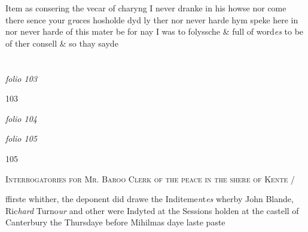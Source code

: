 \documentclass[12pt, a4paper]{book}
\begin{document}
		\ifthenelse{\isodd{\thepage}}
		{\reversemarginpar}
		{\normalmarginpar}
		Item as consering the vecar of charyng I never dranke
 	in his howse nor come there sence your g\textit{ra}ces hosholde dyd
 ly ther nor never harde hym speke here in nor never
 harde of this mater be for nay I was to folyssche \&  full
 of word\textit{es} to be of ther consell \& so thay sayde

\dotfill
						\newpage {} \section*{}  \subsection*{}

\textit{folio 103}



\begin{flushright}{\color{Mahogany}103}\end{flushright}

\dotfill
						\newpage
{}

\textit{folio 104}


               \vspace*{4cm}
               
\dotfill
						

\textit{folio 105}


\begin{flushright}{\color{Mahogany}105}\end{flushright}

				\begin{center} \begin{large} {\scshape Interrogatories for Mr. Baroo
 Clerk of the peace in the shere
 of Kente /} \end{large} \end{center}
			

	
				\marginpar[\vspace{0.5cm}{\textcolor{Gray}{1.}}]{}
			
	
		\ifthenelse{\isodd{\thepage}}
		{\reversemarginpar}
		{\normalmarginpar}
		ffirste whither, the deponent did drawe the Inditeme\textit{n}t\textit{es}
		wherby John Blande, Ric\textit{hard} Turno\textit{ur} and other were Indyted
		at the Sessions holden at the castell of Canterbury the
 Thursdaye before Mihilmas daye laste paste
\end{document}
